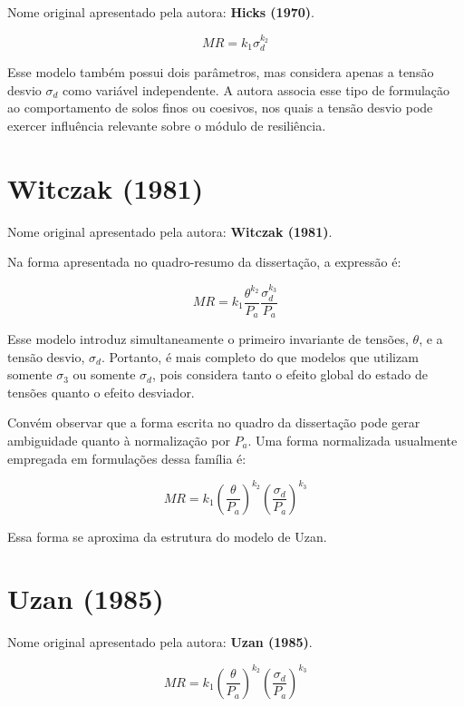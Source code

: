 \documentclass[12pt,a4paper]{article}
\begin{document}
Nome original apresentado pela autora: \textbf{Hicks (1970)}.

\begin{equation}
MR=k_1\sigma_d^{k_2}
\end{equation}

Esse modelo também possui dois parâmetros, mas considera apenas a tensão desvio $\sigma_d$ como variável independente. A autora associa esse tipo de formulação ao comportamento de solos finos ou coesivos, nos quais a tensão desvio pode exercer influência relevante sobre o módulo de resiliência.

\section{Witczak (1981)}

Nome original apresentado pela autora: \textbf{Witczak (1981)}.

Na forma apresentada no quadro-resumo da dissertação, a expressão é:

\begin{equation}
MR=k_1\frac{\theta^{k_2}}{P_a}\frac{\sigma_d^{k_3}}{P_a}
\end{equation}

Esse modelo introduz simultaneamente o primeiro invariante de tensões, $\theta$, e a tensão desvio, $\sigma_d$. Portanto, é mais completo do que modelos que utilizam somente $\sigma_3$ ou somente $\sigma_d$, pois considera tanto o efeito global do estado de tensões quanto o efeito desviador.

Convém observar que a forma escrita no quadro da dissertação pode gerar ambiguidade quanto à normalização por $P_a$. Uma forma normalizada usualmente empregada em formulações dessa família é:

\begin{equation}
MR=k_1\left(\frac{\theta}{P_a}\right)^{k_2}
\left(\frac{\sigma_d}{P_a}\right)^{k_3}
\end{equation}

Essa forma se aproxima da estrutura do modelo de Uzan.

\section{Uzan (1985)}

Nome original apresentado pela autora: \textbf{Uzan (1985)}.

\begin{equation}
MR=k_1\left(\frac{\theta}{P_a}\right)^{k_2}
\left(\frac{\sigma_d}{P_a}\right)^{k_3}
\end{equation}
\end{document}
